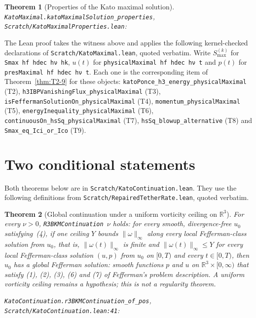 \documentclass[11pt]{article}
\newcommand{\R}{\mathbb{R}}
\newcommand{\lean}[1]{\texttt{#1}}
\newtheorem{theorem}{Theorem}
\theoremstyle{definition}
\theoremstyle{remark}
\begin{document}
\begin{theorem}[Properties of the Kato maximal solution]
\noindent\lean{KatoMaximal.katoMaximalSolution\_properties}, \lean{Scratch/KatoMaximalProperties.lean}:
\end{theorem}

The Lean proof takes the witness above and applies the following kernel-checked declarations of \lean{Scratch/KatoMaximal.lean}, quoted verbatim. Write $S_{\max}^{(k)}$ for \lean{Smax hf hdec hν hk}, $u(t)$ for \lean{physicalMaximal hf hdec hν t} and $p(t)$ for \lean{presMaximal hf hdec hν t}. Each one is the corresponding item of Theorem~\ref{thm:T2-9} for these objects: \lean{katoPonce\_h3\_energy\_physicalMaximal} (T2), \lean{h3IBPVanishingFlux\_physicalMaximal} (T3), \lean{isFeffermanSolutionOn\_physicalMaximal} (T4), \lean{momentum\_physicalMaximal} (T5), \lean{energyInequality\_physicalMaximal} (T6), \lean{continuousOn\_hsSq\_physicalMaximal} (T7), \lean{hsSq\_blowup\_alternative} (T8) and \lean{Smax\_eq\_Ici\_or\_Ico} (T9).

\section{Two conditional statements}
\label{sec:cond}
Both theorems below are in \lean{Scratch/KatoContinuation.lean}. They use the following definitions from \lean{Scratch/RepairedTetherRate.lean}, quoted verbatim.

\begin{theorem}[Global continuation under a uniform vorticity ceiling on $\R^3$]
\label{thm:T10}
For every $\nu>0$, \lean{R3BKMContinuation}\ $\nu$ holds: for every smooth, divergence-free $u_0$ satisfying~(4), if one ceiling $Y$ bounds $\|\omega\|_\infty$ along every local Fefferman-class solution from $u_0$, that is, $\|\omega(t)\|_\infty$ is finite and $\|\omega(t)\|_\infty\le Y$ for every local Fefferman-class solution $(u,p)$ from $u_0$ on $[0,T)$ and every $t\in[0,T)$, then $u_0$ has a global Fefferman solution: smooth functions $p$ and $u$ on $\R^3\times[0,\infty)$ that satisfy (1), (2), (3), (6) and (7) of Fefferman's problem description. A uniform vorticity ceiling remains a hypothesis; this is not a regularity theorem.

\noindent\lean{KatoContinuation.r3BKMContinuation\_of\_pos}, \lean{Scratch/KatoContinuation.lean:41}:
\end{theorem}
\end{document}
